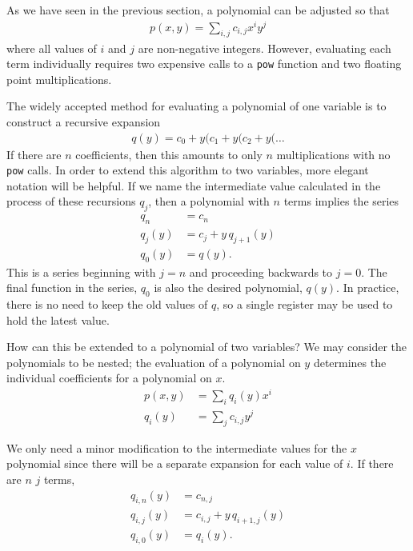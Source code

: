 As we have seen in the previous section, a polynomial can be adjusted so that
\begin{align}
p(x,y) = \sum_{i,j} c_{i,j} x^i y^j
\end{align}
where all values of $i$ and $j$ are non-negative integers.  However, evaluating each term individually requires two expensive calls to a \verb|pow| function and two floating point multiplications.

The widely accepted method for evaluating a polynomial of one variable is to construct a recursive expansion
\begin{align}
q(y) = c_0 + y ( c_1 + y ( c_2 + y ( \ldots
\end{align}
If there are $n$ coefficients, then this amounts to only $n$ multiplications with no \verb|pow| calls.  In order to extend this algorithm to two variables, more elegant notation will be helpful.  If we name the intermediate value calculated in the process of these recursions $q_j$, then a polynomial with $n$ terms implies the series
\begin{align}
q_n &= c_n\\
q_j(y) &= c_j + y\,q_{j+1}(y)\\
q_0(y) &= q(y).
\end{align}
This is a series beginning with $j=n$ and proceeding backwards to $j=0$.  The final function in the series, $q_0$ is also the desired polynomial, $q(y)$.  In practice, there is no need to keep the old values of $q$, so a single register may be used to hold the latest value.

How can this be extended to a polynomial of two variables?  We may consider the polynomials to be nested; the evaluation of a polynomial on $y$ determines the individual coefficients for a polynomial on $x$.
\begin{align}
p(x,y) &= \sum_i q_i(y) x^i\\
q_i(y) &= \sum_j c_{i,j} y^j
\end{align}

We only need a minor modification to the intermediate values for the $x$ polynomial since there will be a separate expansion for each value of $i$.  If there are $n$ $j$ terms,
\begin{subequations}
\begin{align}
q_{i,n}(y) &= c_{n,j}\\
q_{i,j}(y) &= c_{i,j} + y\,q_{i+1,j}(y)\\
q_{i,0}(y) &= q_i(y).
\end{align}
\end{subequations}

